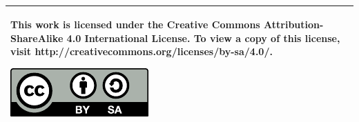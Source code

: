 ~
\vfill
\begin{tabular}{|p{}|}
\hline
This work is licensed under the Creative Commons Attribution-ShareAlike 4.0 International License. To view a copy of this license, visit http://creativecommons.org/licenses/by-sa/4.0/.
\begin{center}
\includegraphics[scale=1]{graphics/cc-by-sa.pdf}
\end{center}\\
\hline
\end{tabular}
